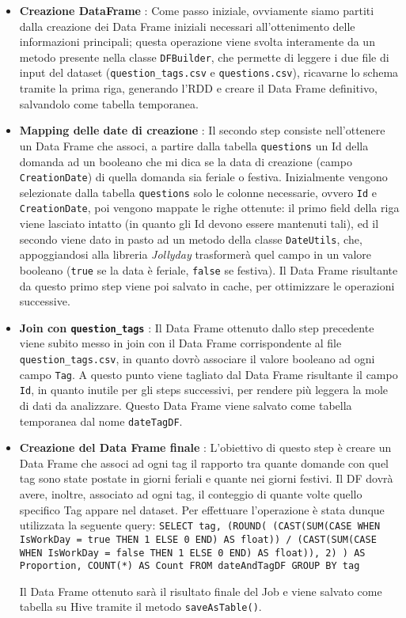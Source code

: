   \begin{itemize}
    \item \textbf{Creazione DataFrame} : Come passo iniziale, ovviamente siamo partiti dalla creazione dei Data Frame iniziali
    necessari all'ottenimento delle informazioni principali; questa operazione viene svolta interamente da un metodo presente nella
    classe \texttt{DFBuilder}, che permette di leggere i due file di input del dataset (\texttt{question\_tags.csv} e
    \texttt{questions.csv}), ricavarne lo schema tramite la prima riga, generando l'RDD e creare il Data Frame definitivo,
    salvandolo come tabella temporanea.
    \item \textbf{Mapping delle date di creazione} : Il secondo step consiste nell'ottenere un Data Frame che associ, a partire dalla
    tabella \texttt{questions} un Id della domanda ad un booleano che mi dica se la data di creazione (campo \texttt{CreationDate})
    di quella domanda sia feriale o festiva.
    Inizialmente vengono selezionate dalla tabella \texttt{questions} solo le colonne necessarie, ovvero \texttt{Id} e
    \texttt{CreationDate}, poi vengono mappate le righe ottenute: il primo field della riga viene lasciato intatto (in quanto gli
    Id devono essere mantenuti tali), ed il secondo viene dato in pasto ad un metodo della classe \texttt{DateUtils}, che,
    appoggiandosi alla libreria \textit{Jollyday} trasformerà quel campo in un valore booleano (\texttt{true} se la data è
    feriale, \texttt{false} se festiva).
    Il Data Frame risultante da questo primo step viene poi salvato in cache, per ottimizzare le operazioni successive.
    \item \textbf{Join con \texttt{question\_tags}} : Il Data Frame ottenuto dallo step precedente viene subito messo in join
    con il Data Frame corrispondente al file \texttt{question\_tags.csv}, in quanto dovrò associare il valore booleano ad ogni
    campo \texttt{Tag}.
    A questo punto viene tagliato dal Data Frame risultante il campo \texttt{Id}, in quanto inutile per gli steps successivi, per
    rendere più leggera la mole di dati da analizzare.
    Questo Data Frame viene salvato come tabella temporanea dal nome \texttt{dateTagDF}.
    \item \textbf{Creazione del Data Frame finale} : L'obiettivo di questo step è creare un Data Frame che associ ad ogni tag
    il rapporto tra quante domande con quel tag sono state postate in giorni feriali e quante nei giorni festivi.
    Il DF dovrà avere, inoltre, associato ad ogni tag, il conteggio di quante volte quello specifico Tag appare nel dataset.
    Per effettuare l'operazione è stata dunque utilizzata la seguente query:
    \texttt{SELECT tag, (ROUND(
    (CAST(SUM(CASE WHEN IsWorkDay = true THEN 1 ELSE 0 END) AS float)) /
    (CAST(SUM(CASE WHEN IsWorkDay = false THEN 1 ELSE 0 END) AS float)), 2)
    ) AS Proportion,
    COUNT(*) AS Count
    FROM dateAndTagDF GROUP BY tag}

    Il Data Frame ottenuto sarà il risultato finale del Job e viene salvato come tabella su Hive tramite il metodo
    \texttt{saveAsTable()}.
  \end{itemize}

